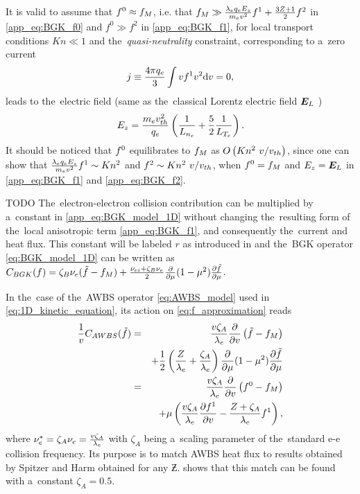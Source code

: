It is valid to assume that $f^0 \approx f_M$, i.e. that $f_M \gg
\frac{\lambda_eq_eE_z}{m_ev^2}f^1 + \frac{3Z + 1}{2}f^2$ 
in \eqref{app_eq:BGK_f0} and $f^0\gg f^2$ in \eqref{app_eq:BGK_f1}, 
for local transport conditions 
$Kn\ll1$ and the~\textit{quasi-neutrality} constraint, corresponding to 
a~zero current
\begin{equation}
j \equiv \frac{4\pi q_e}{3} \int v f^1 v^2 \text{d}v = 0 ,
\end{equation}
leads to the~electric field (same as the~classical Lorentz electric field
$\boldsymbol{E}_L$ \cite{Lorentz_1905})
\begin{equation}
  E_z = \frac{m_ev_{th}^2}{q_e}\left(\frac{1}{L_{n_e}} 
  + \frac{5}{2}\frac{1}{L_{T_e}} \right) .
  \label{app_eq:BGK_Efield}
\end{equation}
It should be noticed that $f^0$ equilibrates to $f_M$ 
as $O\left( Kn^2~v/v_{th} \right)$, since one can show that
$\frac{\lambda_eq_eE_z}{m_ev^2}f^1 \sim Kn^2$ and  
$f^2 \sim Kn^2~v/v_{th}$, when $f^0 = f_M$ and $E_z=\boldsymbol{E}_L$ in 
\eqref{app_eq:BGK_f1} and \eqref{app_eq:BGK_f2}.

TODO
The~electron-electron collision contribution can be 
multiplied by a~constant in \eqref{app_eq:BGK_model_1D} without changing 
the~resulting form of the~local anisotropic term \eqref{app_eq:BGK_f1},
and consequently the~current and heat flux. This constant will be labeled $r$
as introduced in \cite{Brodrick_PoP2017} and the~BGK operator 
\eqref{eq:BGK_model_1D} can be written as 
$C_{BGK}(f) = \zeta_B \nu_{e}(\tilde{f} - f_M) + \frac{\nu_{ei} + \zeta_B \nu_{e}}{2}
  \frac{\partial{}}{\partial{\mu}}(1 - \mu^2)\frac{\partial{\tilde{f}}}{\partial{\mu}}$. 

In the~case of the~AWBS operator \eqref{eq:AWBS_model} used in 
\eqref{eq:1D_kinetic_equation}, its action on \eqref{eq:f_approximation} reads
\begin{eqnarray}
  \frac{1}{v}C_{AWBS}(\tilde{f})
  &=& 
  \frac{v\zeta_A}{\lambda_e} \frac{\partial{}}{\partial{v}}\left(\tilde{f} - f_M\right) 
  \nonumber \\
  && + \frac{1}{2}\left(\frac{Z}{\lambda_e} + \frac{\zeta_A}{\lambda_e}\right)
  \frac{\partial{}}{\partial{\mu}}(1 - \mu^2)\frac{\partial{\tilde{f}}}{\partial{\mu}}  \nonumber \\
  &=& \frac{v\zeta_A}{\lambda_e} \frac{\partial{}}{\partial{v}}\left(f^0 - f_M\right) \nonumber \\ 
  &&\, + \mu\left(\frac{v\zeta_A}{\lambda_e} \frac{\partial{f^1}}{\partial{v}} 
  - \frac{Z+\zeta_A}{\lambda_e}f^1\right) ,
  \label{app_eq:AWBS_model_1D}
\end{eqnarray}
where $\nu_{e}^* = \zeta_A \nu_{e} = \frac{v\zeta_A}{\lambda_e}$ with $\zeta_A$ being a~scaling
parameter of the~standard e-e collision frequency. Its purpose is to
match AWBS heat flux to results obtained by Spitzer and Harm 
\cite{SpitzerHarm_PR1953} obtained for any $\Zbar$. 
 shows that this match can be found with 
a~constant $\zeta_A=0.5$.

